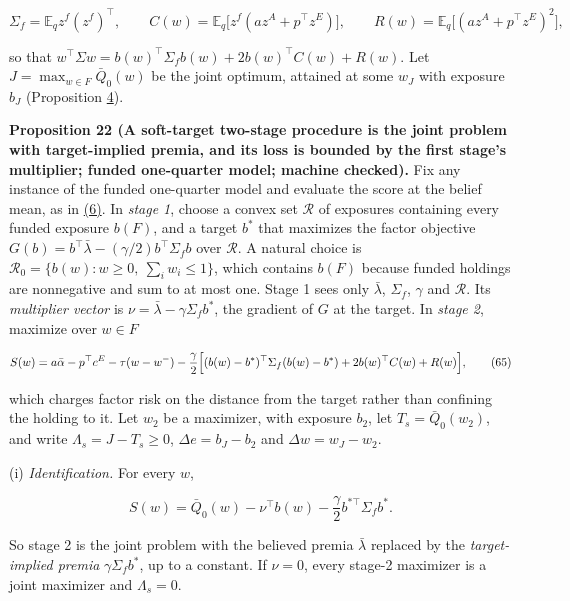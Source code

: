 \documentclass[11pt]{article}
\begin{document}
\begin{equation*}
\Sigma_f=\mathbb E_q z^f(z^f)^\top,\qquad
C(w)=\mathbb E_q\bigl[z^f(az^A+p^\top z^E)\bigr],\qquad
R(w)=\mathbb E_q\bigl[(az^A+p^\top z^E)^2\bigr],\tag{64}\label{eq:64}
\end{equation*}

so that \(w^\top\Sigma w=b(w)^\top\Sigma_fb(w)+2b(w)^\top C(w)
+R(w)\). Let \(J=\max_{w\in F}\bar Q_0(w)\) be the joint optimum,
attained at some \(w_J\) with exposure \(b_J\) (Proposition \hyperref[res:Proposition-4]{4}).

\label{res:Proposition-22}
\textbf{Proposition 22 (A soft-target two-stage procedure is the joint problem with target-implied premia, and its loss is bounded by the first stage's multiplier; funded one-quarter model; machine checked).}
Fix any instance of the funded one-quarter model and evaluate the
score at the belief mean, as in \hyperref[eq:6]{(6)}. In \emph{stage 1}, choose a convex
set \(\mathcal R\) of exposures containing every funded exposure
\(b(F)\), and a target \(b^*\) that maximizes the factor objective
\(G(b)=b^\top\bar\lambda-(\gamma/2)b^\top\Sigma_fb\) over
\(\mathcal R\). A natural choice is
\(\mathcal R_0=\{b(w):w\geq0,\ \sum_iw_i\leq1\}\), which contains
\(b(F)\) because funded holdings are nonnegative and sum to at most
one. Stage 1 sees only \(\bar\lambda\), \(\Sigma_f\), \(\gamma\) and
\(\mathcal R\). Its \emph{multiplier vector} is
\(\nu=\bar\lambda-\gamma\Sigma_fb^*\), the gradient of \(G\) at the
target. In \emph{stage 2}, maximize over \(w\in F\)

\begin{equation*}
S(w)=a\bar\alpha-p^\top c^E-\tau(w-w^-)
 -\frac\gamma2\Bigl[(b(w)-b^*)^\top\Sigma_f(b(w)-b^*)
 +2b(w)^\top C(w)+R(w)\Bigr],\tag{65}\label{eq:65}
\end{equation*}

which charges factor risk on the distance from the target rather
than confining the holding to it. Let \(w_2\) be a maximizer, with
exposure \(b_2\), let \(T_s=\bar Q_0(w_2)\), and write
\(\Lambda_s=J-T_s\geq0\), \(\Delta e=b_J-b_2\) and
\(\Delta w=w_J-w_2\).

(i) \emph{Identification.} For every \(w\),

\begin{equation*}
S(w)=\bar Q_0(w)-\nu^\top b(w)-\frac\gamma2 b^{*\top}\Sigma_fb^*.\tag{66}\label{eq:66}
\end{equation*}

So stage 2 is the joint problem with the believed premia
\(\bar\lambda\) replaced by the \emph{target-implied premia}
\(\gamma\Sigma_fb^*\), up to a constant. If \(\nu=0\), every
stage-2 maximizer is a joint maximizer and \(\Lambda_s=0\).
\end{document}
